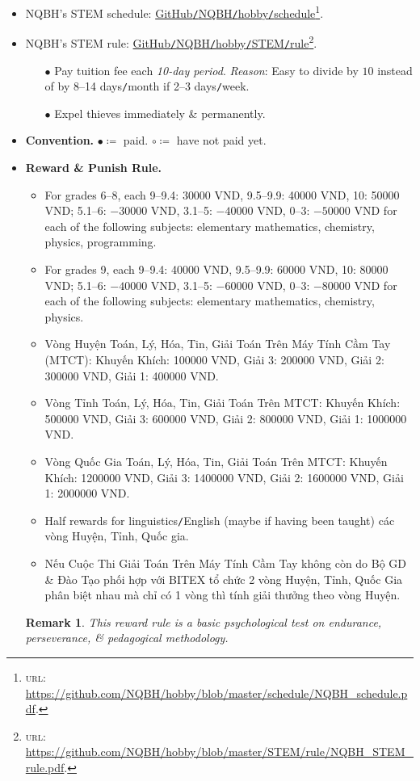 \documentclass{article}
\newtheorem{remark}{Remark}
\begin{document}
\begin{itemize}
	\item NQBH's STEM schedule: \href{https://github.com/NQBH/hobby/blob/master/schedule/NQBH_schedule.pdf}{GitHub\texttt{/}NQBH\texttt{/}hobby\texttt{/}schedule}\footnote{\textsc{url}: \url{https://github.com/NQBH/hobby/blob/master/schedule/NQBH_schedule.pdf}.}.
	\item NQBH's STEM rule: \href{https://github.com/NQBH/hobby/blob/master/STEM/rule/NQBH_STEM_rule.pdf}{GitHub\texttt{/}NQBH\texttt{/}hobby\texttt{/}STEM\texttt{/}rule}\footnote{\textsc{url}: \url{https://github.com/NQBH/hobby/blob/master/STEM/rule/NQBH_STEM_rule.pdf}.}.
	\begin{itemize}
		\item[$\bullet$] Pay tuition fee each \textit{10-day period}. \textit{Reason}: Easy to divide by $10$ instead of by 8--14 days\texttt{/}month if 2--3 days\texttt{/}week.
		\item[$\bullet$] Expel thieves immediately \& permanently.
	\end{itemize}
	\item \textbf{Convention.} $\bullet\coloneq$ paid. $\circ\coloneq$ have not paid yet.
	\item \textbf{Reward \& Punish Rule.}
	\begin{itemize}
		\item For grades 6--8, each 9--9.4: 30000 VND, 9.5--9.9: 40000 VND, 10: 50000 VND; 5.1--6: $-30000$ VND, 3.1--5: $-40000$ VND, 0--3: $-50000$ VND for each of the following subjects: elementary mathematics, chemistry, physics, programming.
		\item For grades 9, each 9--9.4: 40000 VND, 9.5--9.9: 60000 VND, 10: 80000 VND; 5.1--6: $-40000$ VND, 3.1--5: $-60000$ VND, 0--3: $-80000$ VND for each of the following subjects: elementary mathematics, chemistry, physics.
		\item Vòng Huyện Toán, Lý, Hóa, Tin, Giải Toán Trên Máy Tính Cầm Tay (MTCT): Khuyến Khích: 100000 VND, Giải 3: 200000 VND, Giải 2: 300000 VND, Giải 1: 400000 VND.
		\item Vòng Tỉnh Toán, Lý, Hóa, Tin, Giải Toán Trên MTCT: Khuyến Khích: 500000 VND, Giải 3: 600000 VND, Giải 2: 800000 VND, Giải 1: 1000000 VND.
		\item Vòng Quốc Gia Toán, Lý, Hóa, Tin, Giải Toán Trên MTCT: Khuyến Khích: 1200000 VND, Giải 3: 1400000 VND, Giải 2: 1600000 VND, Giải 1: 2000000 VND.
		\item Half rewards for linguistics\texttt{/}English (maybe if having been taught) các vòng Huyện, Tỉnh, Quốc gia.
		\item Nếu Cuộc Thi Giải Toán Trên Máy Tính Cầm Tay không còn do Bộ GD \& Đào Tạo phối hợp với BITEX tổ chức 2 vòng Huyện, Tỉnh, Quốc Gia phân biệt nhau mà chỉ có 1 vòng thì tính giải thưởng theo vòng Huyện.
	\end{itemize}
		 
	\begin{remark}
		This reward rule is a basic psychological test on endurance, perseverance, \& pedagogical methodology.
	\end{remark}
\end{itemize}
\end{document}
